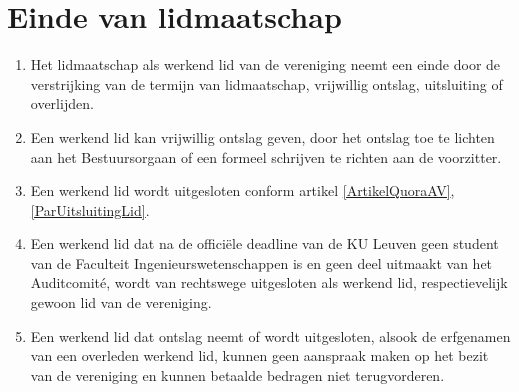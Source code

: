     \section{Einde van lidmaatschap}
    \begin{enumerate}
    \item Het lidmaatschap als werkend lid van de vereniging neemt een einde door de verstrijking van de termijn van lidmaatschap, vrijwillig ontslag, uitsluiting of overlijden. 
    \item Een werkend lid kan vrijwillig ontslag geven, door het ontslag toe te lichten aan het Bestuursorgaan of een formeel schrijven te richten aan de voorzitter.
    \item Een werkend lid wordt uitgesloten conform artikel \ref{ArtikelQuoraAV}, \ref{ParUitsluitingLid}.
    \item Een werkend lid dat na de officiële deadline van de KU Leuven geen student van de Faculteit Ingenieurswetenschappen is en geen deel uitmaakt van het Auditcomité, wordt van rechtswege uitgesloten als werkend lid, respectievelijk gewoon lid van de vereniging.
    \item Een werkend lid dat ontslag neemt of wordt uitgesloten, alsook de erfgenamen van een overleden werkend lid, kunnen geen aanspraak maken op het bezit van de vereniging en kunnen betaalde bedragen niet terugvorderen.
    \end{enumerate}



